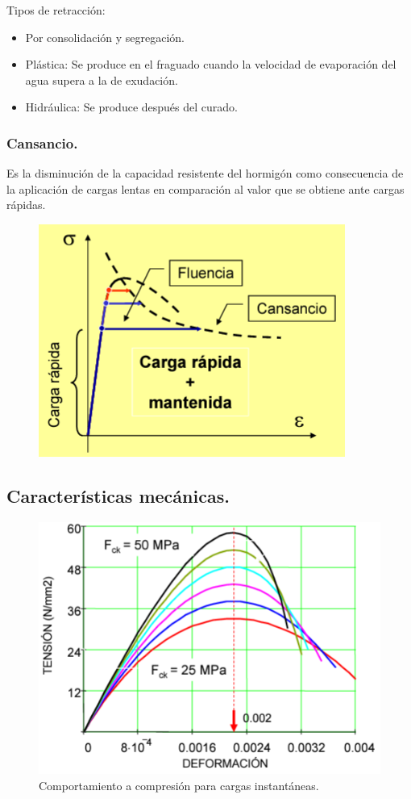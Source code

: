 Tipos de retracción:
\begin{itemize}
    \item Por consolidación y segregación.
    \item Plástica: Se produce en el fraguado cuando la velocidad de evaporación del agua supera a la de exudación.
    \item Hidráulica: Se produce después del curado.
\end{itemize}

\subsubsection{Cansancio.}
Es la disminución de la capacidad resistente del hormigón como consecuencia de la aplicación de cargas lentas en comparación al valor que se obtiene ante cargas rápidas.

\begin{figure}[H]
    \centering
    \includegraphics[width = 0.25 \textwidth]{Imagenes/Curva Cansancio.png}
\end{figure}

\subsection{Características mecánicas.}

\begin{figure}[H]
    \centering
    \includegraphics[width = 0.5 \textwidth]{Imagenes/Comportamiento a compresion para cargas instantaneas.png}
    \caption{Comportamiento a compresión para cargas instantáneas.}
\end{figure}


